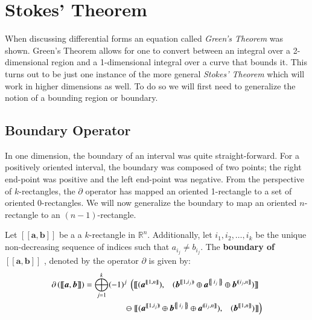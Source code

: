 %
%
\chapter{Stokes' Theorem}

When discussing differential forms an equation called \emph{Green's Theorem} was shown. 
Green's Theorem allows for one to convert between an integral over a 2-dimensional region and a 1-dimensional integral
over a curve that bounds it.
This turns out to be just one instance of the more general \emph{Stokes' Theorem} 
which will work in higher dimensions as well.
To do so we will first need to generalize the notion of a bounding region or boundary.




\section{Boundary Operator}


In one dimension, the boundary of an interval was quite straight-forward.
For a positively oriented interval, the boundary was composed of two points; 
the right end-point was positive and the left end-point was negative.
From the perspective of $k$-rectangles, 
the $\partial$ operator has mapped an oriented 1-rectangle to a set of oriented 0-rectangles.
We will now generalize the boundary to map an oriented $n$-rectangle to an $(n-1)$-rectangle.


\begin{definition}
	Let  $[\![\boldsymbol{a}, \boldsymbol{b}]\!]$ be a a $k$-rectangle in $\mathbb{R}^n$.
	Additionally, let $i_1, i_2, \ldots, i_k$ be the unique non-decreasing sequence of indices such that $a_{i_j} \neq b_{i_j}$.
	The \textbf{boundary of $ \boldsymbol{[\![ a,b ]\!]} $ }, denoted by the operator $\partial$ is given by:
	\begin{align}
		\label{eqn:defboundary}
		\partial \left( [\![ \boldsymbol{a}, \boldsymbol{b} ]\!] \right) 
		= \bigoplus_{j=1}^k (-1)^j \;
			\left(	
				[\![ 	(\boldsymbol{a}^{[\![1,n]\!]}), 
					\;\;\;
					(\boldsymbol{b}^{[\![1,i_j)\!)} 
						\oplus \boldsymbol{a}^{\hset{i_j}}
						\oplus \boldsymbol{b}^{(\!(i_j,n]\!]}) 
				]\!] \right.\;
			\notag\\
			\ominus \left.
				[\![ 	(\boldsymbol{a}^{[\![1,i_j)\!)}
						\oplus \boldsymbol{b}^{\hset{i_j}}
						\oplus \boldsymbol{a}^{(\!(i_j, n]\!]}), 
					\;\;\;		 
					(\boldsymbol{b}^{[\![1,n]\!]}) 			
				]\!]
			\right)
	\end{align}
\end{definition}


